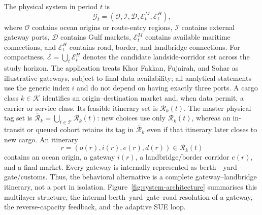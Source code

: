 \documentclass[a4paper,fleqn]{cas-sc}
\begin{document}
The physical system in period $t$ is
\begin{equation}
  \mathcal G_t=(\mathcal O,\mathcal I,\mathcal D,
  \mathcal E^{M}_t,\mathcal E^{H}_t),
  \label{eq:network}
\end{equation}
where $\mathcal O$ contains ocean origins or route-entry regions,
$\mathcal I$ contains external gateway ports, $\mathcal D$ contains Gulf
markets, $\mathcal E^{M}_t$ contains available maritime connections, and
$\mathcal E^{H}_t$ contains road, border, and landbridge connections.
For compactness, $\mathcal E=\bigcup_t\mathcal E^H_t$ denotes the candidate
landside-corridor set across the study horizon.
The application treats Khor Fakkan, Fujairah, and Sohar as illustrative
gateways, subject to final data availability; all analytical statements use the
generic index $i$ and do not depend on having exactly three ports. A cargo
class $k\in\mathcal K$ identifies an origin--destination market and, when data
permit, a carrier or service class. Its feasible itinerary set is
$\mathcal R_k(t)$. The master physical tag set is
$\overline{\mathcal R}_k=\bigcup_{t\in\mathcal T}\mathcal R_k(t)$: new choices
use only $\mathcal R_k(t)$, whereas an in-transit or queued cohort retains its
tag in $\overline{\mathcal R}_k$ even if that itinerary later closes to new
cargo. An itinerary
\begin{equation}
  r=(o(r),i(r),e(r),d(r))\in\mathcal R_k(t)
  \label{eq:itinerary}
\end{equation}
contains an ocean origin, a gateway $i(r)$, a landbridge/border corridor $e(r)$,
and a final market. Every gateway is internally represented as
berth - yard - gate/customs. Thus, the behavioral
alternative is a complete gateway--landbridge itinerary, not a port in
isolation. Figure~\ref{fig:system-architecture} summarises this multilayer
structure, the internal berth--yard--gate--road resolution of a gateway, the
reverse-capacity feedback, and the adaptive SUE loop.
\end{document}
